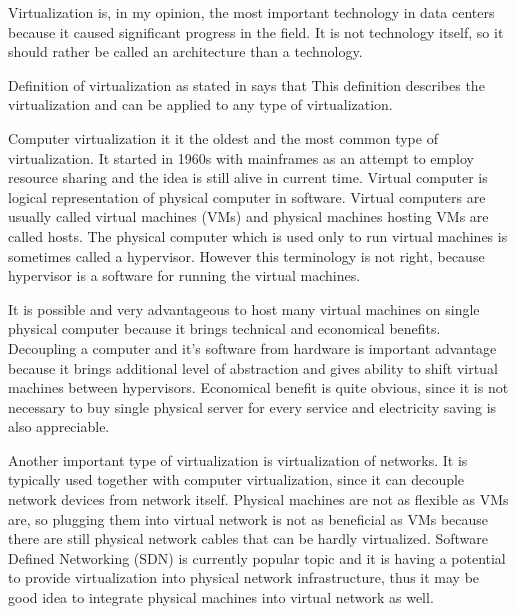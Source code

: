 
Virtualization is, in my opinion, the most important technology in data centers because it caused significant progress in the field. It is not technology itself, so it should rather be called an architecture than a technology.

Definition of virtualization as stated in \cite{virtualization-in-education} says that  This definition describes the virtualization and can be applied to any type of virtualization.

Computer virtualization it it the oldest and the most common type of virtualization.
It started in 1960s with mainframes as an attempt to employ resource sharing and the idea is still alive in current time. 
Virtual computer is logical representation of physical computer in software. \cite{virtualization-in-education} Virtual computers are usually called virtual machines (\Ac{VM}s) and physical machines hosting \Ac{VM}s are called hosts. 
The physical computer which is used only to run virtual machines is sometimes called a hypervisor. However this terminology is not right, because hypervisor is a software for running the virtual machines.

It is possible and very advantageous to host many virtual machines on single physical computer because it brings technical and economical benefits. Decoupling a computer and it's software from hardware is important advantage because it brings additional level of abstraction and gives ability to shift virtual machines between hypervisors. Economical benefit is quite obvious, since it is not necessary to buy single physical server for every service and electricity saving is also appreciable.

Another important type of virtualization is virtualization of networks. It is typically used together with computer virtualization, since it can decouple network devices from network itself. Physical machines are not as flexible as \Ac{VM}s are, so plugging them into virtual network is not as beneficial as \Ac{VM}s because there are still physical network cables that can be hardly virtualized. Software Defined Networking (\Ac{SDN}) is currently popular topic and it is having a potential to provide virtualization into physical network infrastructure, thus it may be good idea to integrate physical machines into virtual network as well.

